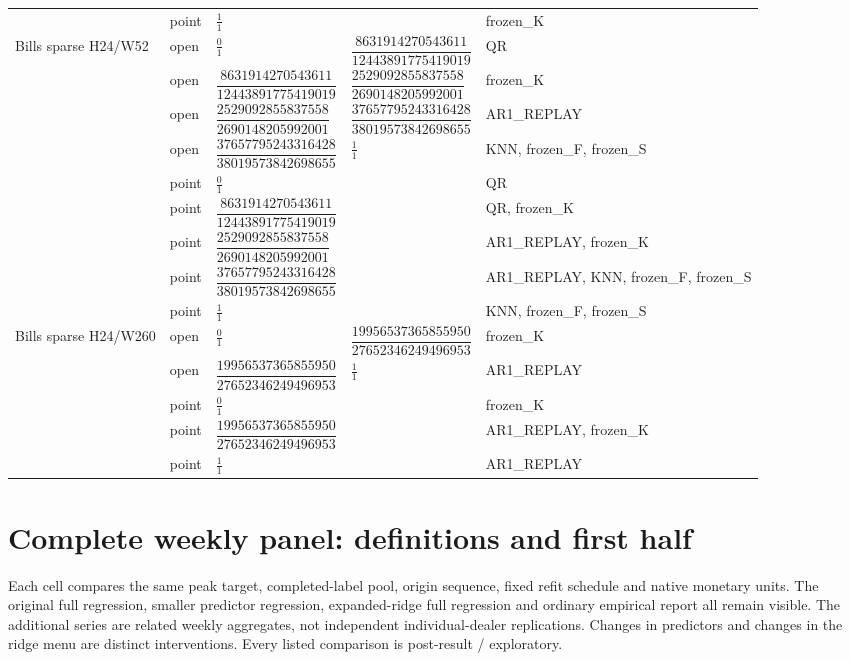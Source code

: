 \documentclass[11pt,a4paper]{article}
\begin{document}
\begin{longtable}{p{28mm}p{10mm}p{39mm}p{39mm}p{28mm}}
 & point & \(\frac{1}{1}\) &  & frozen\_K \\
Bills sparse H24/W52 & open & \(\frac{0}{1}\) & \(\dfrac{8631914270543611}{12443891775419019}\) & QR \\
 & open & \(\dfrac{8631914270543611}{12443891775419019}\) & \(\dfrac{2529092855837558}{2690148205992001}\) & frozen\_K \\
 & open & \(\dfrac{2529092855837558}{2690148205992001}\) & \(\dfrac{37657795243316428}{38019573842698655}\) & AR1\_REPLAY \\
 & open & \(\dfrac{37657795243316428}{38019573842698655}\) & \(\frac{1}{1}\) & KNN, frozen\_F, frozen\_S \\
 & point & \(\frac{0}{1}\) &  & QR \\
 & point & \(\dfrac{8631914270543611}{12443891775419019}\) &  & QR, frozen\_K \\
 & point & \(\dfrac{2529092855837558}{2690148205992001}\) &  & AR1\_REPLAY, frozen\_K \\
 & point & \(\dfrac{37657795243316428}{38019573842698655}\) &  & AR1\_REPLAY, KNN, frozen\_F, frozen\_S \\
 & point & \(\frac{1}{1}\) &  & KNN, frozen\_F, frozen\_S \\
Bills sparse H24/W260 & open & \(\frac{0}{1}\) & \(\dfrac{19956537365855950}{27652346249496953}\) & frozen\_K \\
 & open & \(\dfrac{19956537365855950}{27652346249496953}\) & \(\frac{1}{1}\) & AR1\_REPLAY \\
 & point & \(\frac{0}{1}\) &  & frozen\_K \\
 & point & \(\dfrac{19956537365855950}{27652346249496953}\) &  & AR1\_REPLAY, frozen\_K \\
 & point & \(\frac{1}{1}\) &  & AR1\_REPLAY \\
\end{longtable}
\endgroup

\section{Complete weekly panel: definitions and first half}\label{sup:panel}

Each cell compares the same peak target, completed-label pool,
origin sequence, fixed refit schedule and native monetary units. The original
full regression, smaller predictor regression, expanded-ridge full regression
and ordinary empirical report all remain visible. The additional series are
related weekly aggregates, not independent individual-dealer replications.
Changes in predictors and changes in the ridge menu are distinct interventions.
Every listed comparison is post-result / exploratory.
\end{document}

